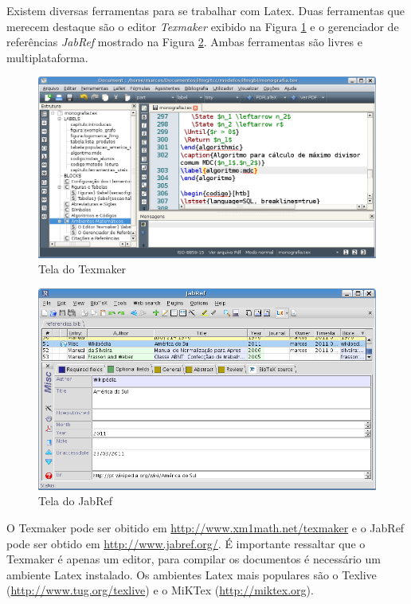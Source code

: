 Existem diversas ferramentas para se trabalhar com Latex. Duas ferramentas que merecem destaque são o editor \textit{Texmaker} exibido na Figura \ref{figura:texmaker} e o gerenciador de referências \textit{JabRef} mostrado na Figura \ref{figura:jabref}. Ambas ferramentas são livres e multiplataforma.

\begin{figure}[!htb]
 \caption{Tela do Texmaker} \label{figura:texmaker}
 \begin{varwidth}{\linewidth}
  \includegraphics[width=\textwidth]{figuras/texmaker}
 \end{varwidth}
\end{figure}

\begin{figure}[!htb]
 \caption{Tela do JabRef} \label{figura:jabref}
 \begin{varwidth}{\linewidth}
  \includegraphics[width=\textwidth]{figuras/jabref}
 \end{varwidth}
\end{figure}

O Texmaker pode ser obitido em \url{http://www.xm1math.net/texmaker} e o JabRef pode ser obtido em \url{http://www.jabref.org/}. É importante ressaltar que o Texmaker é apenas um editor, para compilar os documentos é necessário um ambiente Latex instalado. Os ambientes Latex mais populares são o Texlive (\url{http://www.tug.org/texlive}) e o MiKTex (\url{http://miktex.org}).
